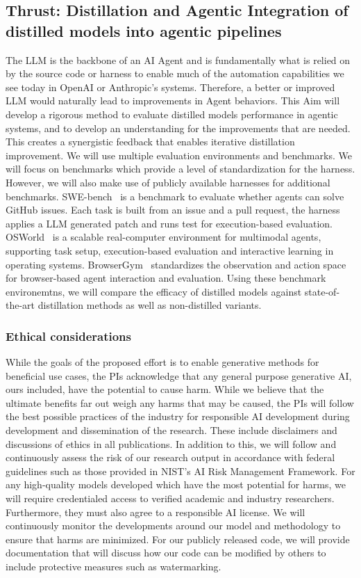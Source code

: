 \subsection{Thrust: Distillation and Agentic Integration of distilled models into agentic pipelines}

The LLM is the backbone of an AI Agent and is fundamentally what is relied on by the source code or harness to enable much of the automation capabilities we see today in OpenAI or Anthropic's systems. Therefore, a better or improved LLM would naturally lead to improvements in Agent behaviors. This Aim will develop a rigorous method to evaluate distilled models performance in agentic systems, and to develop an understanding for the improvements that are needed. This creates a synergistic feedback that enables iterative distillation improvement. We will use multiple evaluation environments and benchmarks. We will focus on benchmarks which provide a level of standardization for the harness. However, we will also make use of publicly available harnesses for additional benchmarks. 
SWE-bench~\cite{jimenez2024swebench} is a benchmark to evaluate whether agents can solve GitHub issues. Each task is built from an issue and a pull request, the harness applies a LLM generated patch and runs test for execution-based evaluation. OSWorld~\cite{xie2024osworld} is a scalable real-computer environment for multimodal agents, supporting task setup, execution-based evaluation and interactive learning in operating systems. BrowserGym~\cite{le_sellier_de_chezelles2025browsergym} standardizes the observation and action space for browser-based agent interaction and evaluation. Using these benchmark environemtns, we will compare the efficacy of distilled models against state-of-the-art distillation methods as well as non-distilled variants.

\subsubsection*{Ethical considerations}
While the goals of the proposed effort is to enable generative methods for beneficial use cases, the PIs acknowledge that any general purpose generative AI, ours included, have the potential to cause harm. While we believe that the ultimate benefits far out weigh any harms that may be caused, the PIs will follow the best possible practices of the industry for responsible AI development during development and dissemination of the research. These include disclaimers and discussions of ethics in all publications. In addition to this, we will follow and continuously assess the risk of our research output in accordance with federal guidelines such as those provided in NIST's AI Risk Management Framework. For any high-quality models developed which have the most potential for harms, we will require credentialed access to verified academic and industry researchers. Furthermore, they must also agree to a responsible AI license. We will continuously monitor the developments around our model and methodology to ensure that harms are minimized. For our publicly released code, we will provide documentation that will discuss how our code can be modified by others to include protective measures such as watermarking.

